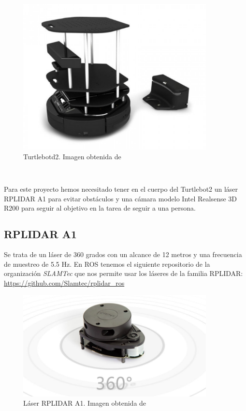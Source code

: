 \begin{figure} [H]
  \begin{center}
    \includegraphics[width=10cm]{imagenes/cap3/turtlebot2-real.png}
  \end{center}
  \caption[Turtlebot2]{Turtlebotd2. Imagen obtenida de \cite{turtlebot2}}
  \label{fig:turtlebot2_real}
\end{figure}\

Para este proyecto hemos necesitado tener en el cuerpo del Turtlebot2 un láser RPLIDAR A1 para evitar obstáculos y una cámara modelo Intel Realsense 3D R200 para seguir al objetivo en la tarea de seguir a una persona.

\subsection{RPLIDAR A1}
\label{subsec:turtlebot2_rplidar_a1}

Se trata de un láser de 360 grados con un alcance de 12 metros y una frecuencia de muestreo de 5.5 Hz. En ROS tenemos el siguiente repositorio de la organización \textit{SLAMTec} que nos permite usar los láseres de la familia RPLIDAR: \url{https://github.com/Slamtec/rplidar_ros}\\

\begin{figure} [H]
  \begin{center}
    \includegraphics[width=10cm]{imagenes/cap3/rplidar-a1.png}
  \end{center}
  \caption[Láser RPLIDAR A1]{Láser RPLIDAR A1. Imagen obtenida de \cite{rplidar_a1}}
  \label{fig:rplidar_a1}
\end{figure}\

